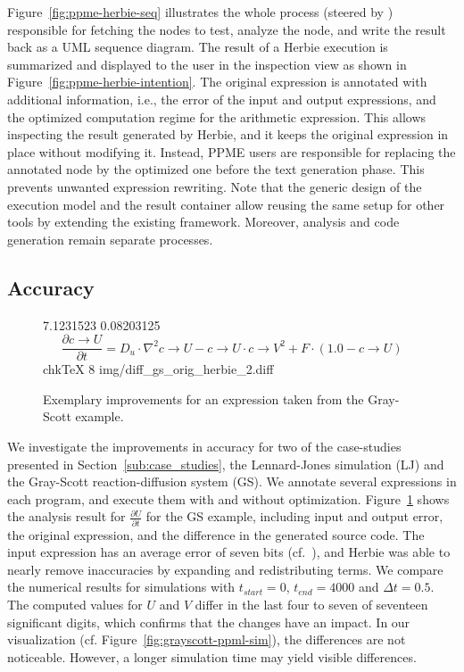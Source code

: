 Figure~\ref{fig:ppme-herbie-seq} illustrates the whole process (steered by 
) responsible for fetching the nodes to test, analyze the node, 
and write the result back as a UML sequence diagram.
%
The result of a Herbie execution is summarized and displayed to the user in the
inspection view as shown in Figure~\ref{fig:ppme-herbie-intention}. The original
expression is annotated with additional information, i.e., the error of the input and output
expressions, and the optimized computation regime for the arithmetic expression. This
allows inspecting the result generated by Herbie, and it keeps the
original expression in place without modifying it. Instead, PPME users
are responsible for replacing the annotated node by the optimized one before the
text generation phase. This prevents unwanted expression rewriting. 
%
Note that the generic design of the
execution model and the result container allow reusing the same setup for other
tools by extending the existing framework.
Moreover, analysis and code generation remain separate
processes. 

\subsection{Accuracy }
\label{par:accuracy_improvements}

\begin{figure}
\footnotesize
\improvementsFigure%
{7.1231523}%
{0.08203125}%
{%
\[
\frac{\partial c \to U}{\partial t} = D_u \cdot \nabla^2 c \to U - c \to U \cdot c \to V^2 + F \cdot (1.0 - c \to U)
\]
%
\vspace*{-8pt}
 chkTeX 8
{img/diff_gs_orig_herbie_2.diff}%
}
\caption{Exemplary improvements for an expression taken from the Gray-Scott example.}
\label{fig:herbie-improvements:gs_dU} %
\end{figure}
%
We investigate the improvements in accuracy for two of the case-studies presented 
in Section~\ref{sub:case_studies}, the Lennard-Jones
simulation (LJ) and the Gray-Scott reaction-diffusion system (GS). We annotate
several expressions in each program, and execute them with and without optimization.
%
Figure~\ref{fig:herbie-improvements:gs_dU} shows the analysis result for 
$\frac{\partial U}{\partial t}$ for the GS example, including
input and output error, the original expression, and the difference in the
generated source code. The input expression has an average error of
 seven bits (cf.~\cite{Panchekha2015}), 
and Herbie was able to nearly remove inaccuracies by 
expanding and redistributing terms. We compare the numerical results for
simulations with $t_{start}=0$, $t_{end} = 4000$ and $\Delta{t}=0.5$. 
%
The computed values for $U$ and $V$ differ in the last four to seven of seventeen significant digits, 
which confirms that the changes have an impact. In our visualization (cf. Figure~\ref{fig:grayscott-ppml-sim}), 
the differences are not noticeable. However, a longer simulation time may yield visible differences.


